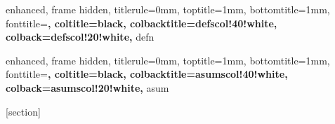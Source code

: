 {
    enhanced,
    frame hidden,
    titlerule=0mm,
    toptitle=1mm,
    bottomtitle=1mm,
    fonttitle=\sffamily\bfseries,
    coltitle=black,
    colbacktitle=defscol!40!white,
    colback=defscol!20!white,
}{defn}




{
    enhanced,
    frame hidden,
    titlerule=0mm,
    toptitle=1mm,
    bottomtitle=1mm,
    fonttitle=\sffamily\bfseries,
    coltitle=black,
    colbacktitle=asumscol!40!white,
    colback=asumscol!20!white,
}{asum}





[section]
\renewcommand{\themytheorem}{\Roman{chapter}.\thesection.\arabic{mytheorem}}


\makeatletter
\newenvironment{thmpf}{%
  \par\noindent{\it \textbfs{Proof for Theorem.}}\par
  \tcolorbox[
    blanker,
    breakable,
    enhanced jigsaw,
    parbox=false,
    colback=white,
    left=5mm,
    before upper={\parindent15pt\relax\allowdisplaybreaks},
    after skip=10pt,
    borderline west={1mm}{0pt}{thmscol!20!white}
  ]%
}{%
  \textcolor{thmscol!18!white}{\hbox{}\nobreak\hfill$\blacksquare$}%
  \endtcolorbox
}
\makeatother



